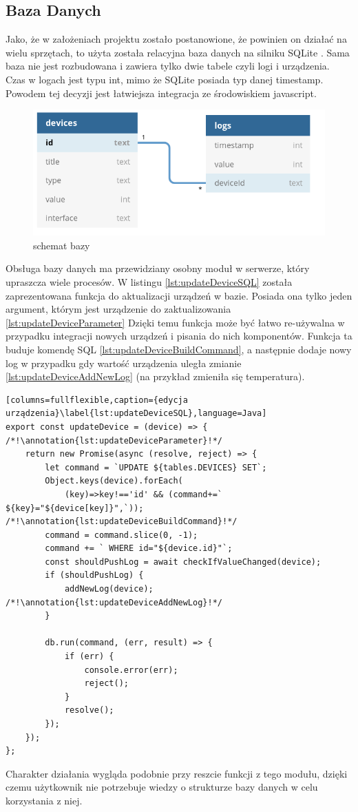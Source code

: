 \subsection{Baza Danych}
Jako, że w założeniach projektu zostało postanowione, że powinien on działać na wielu sprzętach, to użyta została relacyjna baza danych na silniku SQLite \cite{sqlite}. Sama baza nie jest rozbudowana i zawiera tylko dwie tabele czyli logi i urządzenia. Czas w logach jest typu int, mimo że SQLite posiada typ danej timestamp. Powodem tej decyzji jest łatwiejsza integracja ze środowiskiem javascript. \cite{sqlitejs}
\begin{figure}[h!]
  \includegraphics[width=\linewidth]{db.png}
  \caption{schemat bazy}
  \label{fig:db}
\end{figure}

Obsługa bazy danych ma przewidziany osobny moduł w serwerze, który upraszcza wiele procesów. W listingu \ref{lst:updateDeviceSQL} została zaprezentowana funkcja do aktualizacji urządzeń w bazie. Posiada ona tylko jeden argument, którym jest urządzenie do zaktualizowania \ref{lst:updateDeviceParameter} Dzięki temu funkcja może być łatwo re-używalna w przypadku integracji nowych urządzeń i pisania do nich komponentów. Funkcja ta buduje komendę SQL \ref{lst:updateDeviceBuildCommand}, a następnie dodaje nowy log w przypadku gdy wartość urządzenia uległa zmianie \ref{lst:updateDeviceAddNewLog} (na przykład zmieniła się temperatura).
\newpage
\begin{lstlisting}[columns=fullflexible,caption={edycja urządzenia}\label{lst:updateDeviceSQL},language=Java]
export const updateDevice = (device) => { /*!\annotation{lst:updateDeviceParameter}!*/
	return new Promise(async (resolve, reject) => {
		let command = `UPDATE ${tables.DEVICES} SET`;
		Object.keys(device).forEach(
		    (key)=>key!=='id' && (command+=` ${key}="${device[key]}",`)); /*!\annotation{lst:updateDeviceBuildCommand}!*/
		command = command.slice(0, -1);
		command += ` WHERE id="${device.id}"`;
		const shouldPushLog = await checkIfValueChanged(device);
		if (shouldPushLog) {
			addNewLog(device); /*!\annotation{lst:updateDeviceAddNewLog}!*/
		}

		db.run(command, (err, result) => {
			if (err) {
				console.error(err);
				reject();
			}
			resolve();
		});
	});
};
\end{lstlisting}
Charakter działania wygląda podobnie przy reszcie funkcji z tego modułu, dzięki czemu użytkownik nie potrzebuje wiedzy o strukturze bazy danych w celu korzystania z niej. 

